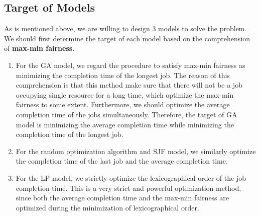 \documentclass{llncs}
\begin{document}
\subsection{Target of Models}
As is mentioned above, we are willing to design $3$ models to solve the problem. We should first determine the target of each model based on the comprehension of {\bf max-min fairness}.
\begin{enumerate}
    \item For the GA model, we regard the procedure to satisfy max-min fairness as minimizing the completion time of the longest job. The reason of this comprehension is that this method make sure that there will not be a job occupying single resource for a long time, which optimize the max-min fairness to some extent. Furthermore, we should optimize the average completion time of the jobs simultaneously. Therefore, the target  of GA model is minimizing the average completion time while minimizing the completion time of the longest job.
    \item For the random optimization algorithm and SJF model, we similarly optimize the completion time of the last job and the average completion time.
    \item For the LP model, we strictly optimize the lexicographical order of the job completion time. This is a very strict and powerful optimization method, since both the average completion time and the max-min fairness are optimized during the minimization of lexicographical order.
\end{enumerate}
\end{document}
